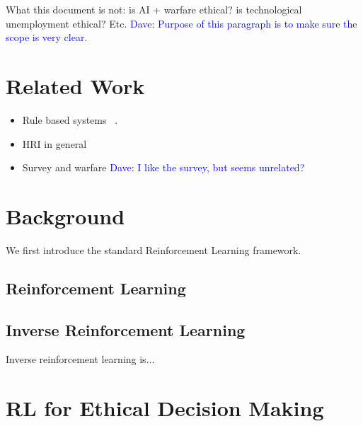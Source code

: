 \documentclass[11pt]{article}
\newcommand\davenote[1]{\textcolor{blue}{Dave: #1}}
\begin{document}
What this document is not: is AI + warfare ethical? is technological unemployment ethical? Etc. \davenote{Purpose of this paragraph is to make sure the scope is very clear.}


\section{Related Work}

\begin{itemize}
\item Rule based systems ~\cite{briggs2015sorry}. 
\item HRI in general~\cite{scheutz2007first,tellex2011understanding}
\item Survey and warfare \davenote{I like the survey, but seems unrelated?}
\end{itemize}


\section{Background}

We first introduce the standard Reinforcement Learning framework.


\subsection{Reinforcement Learning}

\subsection{Inverse Reinforcement Learning}

Inverse reinforcement learning is...

\section{RL for Ethical Decision Making}
\end{document}
